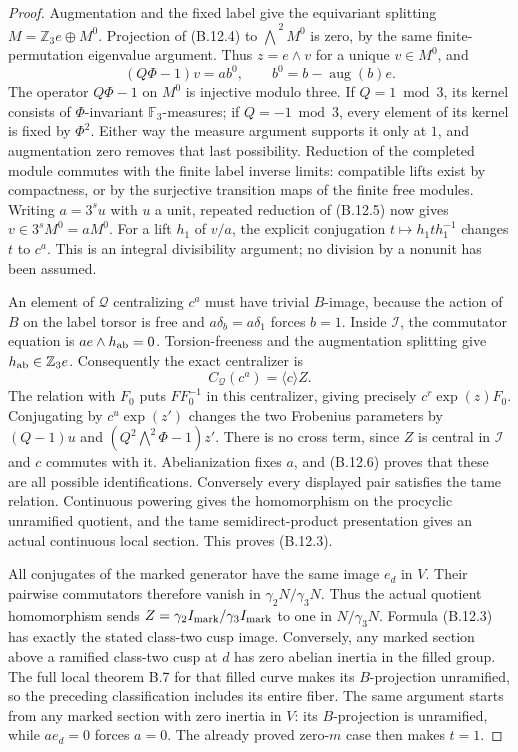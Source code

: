 \begin{proof}
Augmentation and the fixed label give the equivariant
splitting $M=\mathbb Z_3e\oplus M^0$.
Projection of (B.12.4) to
$\widehat{\bigwedge}^{\,2}M^0$ is zero, by the same
finite-permutation eigenvalue argument. Thus
$z=e\wedge v$ for a unique $v\in M^0$, and
\[
                     (Q\Phi-1)v=a b^0,
           \qquad b^0=b-\operatorname{aug}(b)e.             \tag{B.12.5}
\]
The operator $Q\Phi-1$ on $M^0$ is injective modulo
three. If $Q=1\bmod3$, its kernel consists of
$\Phi$-invariant $\mathbb F_3$-measures; if
$Q=-1\bmod3$, every element of its kernel is fixed
by $\Phi^2$. Either way the measure argument supports
it only at $1$, and augmentation zero removes that
last possibility. Reduction of the completed module
commutes with the finite label inverse limits:
compatible lifts exist by compactness, or by the
surjective transition maps of the finite free
modules.
Writing $a=3^s u$ with $u$ a unit, repeated reduction
of (B.12.5) now gives $v\in3^sM^0=aM^0$.
For a lift $h_1$ of $v/a$, the explicit conjugation
$t\mapsto h_1t h_1^{-1}$ changes $t$ to $c^a$.
This is an integral divisibility argument; no
division by a nonunit has been assumed.

An element of $\mathscr Q$ centralizing $c^a$ must
have trivial $B$-image, because the action of $B$
on the label torsor is free and
$a\delta_b=a\delta_1$ forces $b=1$.
Inside $\mathscr I$, the commutator equation is
$a e\wedge h_{\rm ab}=0$. Torsion-freeness and the
augmentation splitting give $h_{\rm ab}\in\mathbb Z_3e$.
Consequently the exact centralizer is
\[
                         C_{\mathscr Q}(c^a)
                                  =\langle c\rangle Z.     \tag{B.12.6}
\]
The relation with $F_0$ puts $F F_0^{-1}$ in this
centralizer, giving precisely $c^r\exp(z)F_0$.
Conjugating by $c^u\exp(z')$ changes the two
Frobenius parameters by
$(Q-1)u$ and $(Q^2\bigwedge^2\Phi-1)z'$.
There is no cross term, since $Z$ is central in
$\mathscr I$ and $c$ commutes with it.
Abelianization fixes $a$, and (B.12.6) proves that
these are all possible identifications.
Conversely every displayed pair satisfies the
tame relation. Continuous powering gives the
homomorphism on the procyclic unramified quotient,
and the tame semidirect-product presentation gives
an actual continuous local section. This proves
(B.12.3).

All conjugates of the marked generator have the
same image $e_d$ in $V$. Their pairwise commutators
therefore vanish in $\gamma_2N/\gamma_3N$.
Thus the actual quotient homomorphism sends
$Z=\gamma_2I_{\rm mark}/\gamma_3I_{\rm mark}$ to one
in $N/\gamma_3N$. Formula (B.12.3) has exactly the
stated class-two cusp image.
Conversely, any marked section above a ramified
class-two cusp at $d$ has zero abelian inertia in
the filled group. The full local theorem B.7 for
that filled curve makes its $B$-projection unramified,
so the preceding classification includes its entire
fiber.
The same argument starts from any marked section
with zero inertia in $V$: its $B$-projection is
unramified, while $a e_d=0$ forces $a=0$.
The already proved zero-$m$ case then makes $t=1$.
\end{proof}


